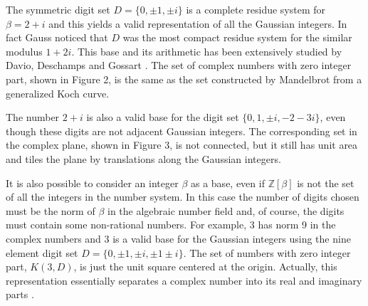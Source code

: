 \documentclass[12pt]{article}
\newcommand{\Z}{\mathbb{Z}}
\begin{document}
    The symmetric digit set $D = \{0, \pm1, \pm i\}$ is a complete residue system for $\beta = 2 + i$ and this yields a valid representation of all the Gaussian integers. 
In fact Gauss noticed \cite[p. 172]{gauss} that $D$ was the most compact
residue system for the similar modulus $1 + 2i$. This base and its arithmetic
has been extensively studied by Davio, Deschamps and Gossart \cite{davio}. 
The set of complex numbers with zero integer part, shown in Figure 2, is the same as the set constructed by Mandelbrot \cite[Plate 49]{mandelbrot} from a generalized Koch curve.

    The number $2 + i$ is also a valid base for the digit set 
$\{0, 1, \pm i, -2 - 3i\}$,
even though these digits are not adjacent Gaussian integers.  
The corresponding set in the complex plane, shown in Figure 3, is not connected, but it still has unit area and tiles the plane by translations along the Gaussian integers.

    It is also possible to consider an integer $\beta$ as a base, even if $\Z[\beta]$ is not
the set of all the integers in the number system. In this case the number of
digits chosen must be the norm of $\beta$ in the algebraic number field and, of
course, the digits must contain some non-rational numbers. For example, 3
has norm 9 in the complex numbers and 3 is a valid base for the Gaussian
integers using the nine element digit set $D = \{0, \pm1, \pm i, \pm1\pm i\}$. The set of numbers with zero integer part, $K(3, D)$, is just the unit square centered
at the origin. Actually, this representation essentially separates a complex
number into its real and imaginary parts \cite[\S4.3.1]{davio}.
\end{document}
